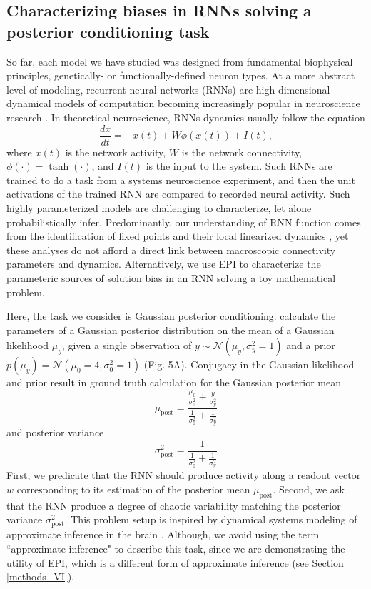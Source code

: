 \documentclass[11pt]{article}
\begin{document}
\subsection{Characterizing biases in RNNs solving a posterior conditioning task} \label{results_RNN}
So far, each model we have studied was designed from fundamental biophysical principles, genetically- or functionally-defined neuron types.  
At a more abstract level of modeling, recurrent neural networks (RNNs) are high-dimensional dynamical models of computation becoming increasingly popular in neuroscience research \cite{barak2017recurrent}. 
In theoretical neuroscience, RNNs dynamics usually follow the equation
\begin{equation}
\frac{dx}{dt} = -x(t) + W \phi(x(t)) + I(t),
\end{equation}
where $x(t)$ is the network activity, $W$ is the network connectivity, $\phi(\cdot) = \tanh(\cdot)$, and $I(t)$ is the input to the system.
Such RNNs are trained to do a task from a systems neuroscience experiment, and then the unit activations of the trained RNN are compared to recorded neural activity.
Such highly parameterized models are challenging to characterize, let alone probabilistically infer. 
Predominantly, our understanding of RNN function comes from the identification of fixed points and their local linearized dynamics \cite{sussillo2013opening}, yet these analyses do not afford a direct link between macroscopic connectivity parameters and dynamics.
Alternatively, we use EPI to characterize the parameteric sources of solution bias in an RNN solving a toy mathematical problem.

Here, the task we consider is Gaussian posterior conditioning: calculate the parameters of a Gaussian posterior distribution on the mean of a Gaussian likelihood $\mu_y$, given a single observation of $y \sim \mathcal{N}(\mu_y,\sigma^2_y = 1)$ and a prior $p(\mu_y) = \mathcal{N}(\mu_0=4, \sigma_0^2=1)$ (Fig. 5A).  Conjugacy in the Gaussian likelihood and prior result in ground truth calculation for the Gaussian posterior mean 
\begin{equation}
\mu_{\text{post}} = \frac{\frac{\mu_0}{\sigma_0^2} + \frac{y}{\sigma_y^2}}{\frac{1}{\sigma_0^2} + \frac{1}{\sigma_y^2}}
\end{equation}
 and posterior variance 
\begin{equation}
 \sigma^2_{\text{post}} = \frac{1}{\frac{1}{\sigma_0^2} + \frac{1}{\sigma_y^2}}
\end{equation}
First, we predicate that the RNN should produce activity along a readout vector $w$ corresponding to its estimation of the posterior mean $\mu_{\text{post}}$. Second, we ask that the RNN produce a degree of chaotic variability matching the posterior variance $\sigma^2_{\text{post}}$.  This problem setup is inspired by dynamical systems modeling of approximate inference in the brain \cite{echeveste2019cortical}.  Although, we avoid using the term ``approximate inference" to describe this task, since we are demonstrating the utility of EPI, which is a different form of approximate inference (see Section \ref{methods_VI}).
\end{document}
